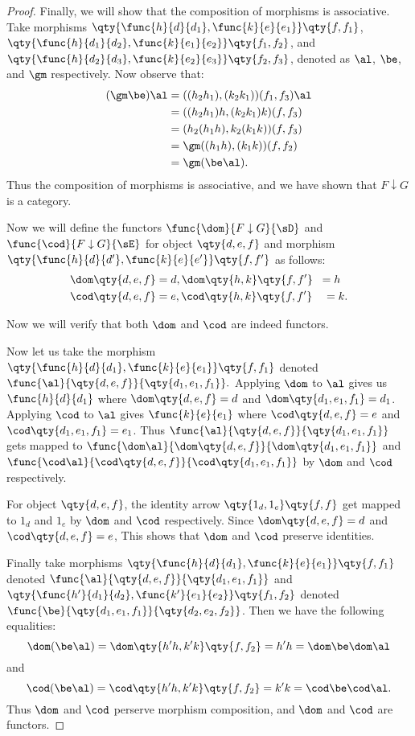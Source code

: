 \documentclass[../../main]{subfiles}
\begin{document}
\begin{proof}
	Finally, we will show that the composition of morphisms is associative. Take
	morphisms
	$\qty{\func{h}{d}{d_1},\func{k}{e}{e_1}} \qty{f,f_1}$,
	$\qty{\func{h}{d_1}{d_2},\func{k}{e_1}{e_2}} \qty{f_1,f_2}$, and
	$\qty{\func{h}{d_2}{d_3},\func{k}{e_2}{e_3}} \qty{f_2,f_3}$, denoted as
	$\al$, $\be$, and $\gm$ respectively. Now observe that:
	\begin{align*}
	(\gm\be)\al&=((h_2h_1),(k_2 k_1))(f_1,f_3) \al\\
	&=((h_2 h_1) h,(k_2 k_1) k)(f,f_3)\\
	&=(h_2(h_1 h),k_2(k_1 k))(f,f_3)\\
	&=\gm((h_1 h),(k_1 k))(f,f_2)\\
	&=\gm(\be \al).
	\end{align*}
	Thus the composition of morphisms is associative, and we have shown
	that $F \downarrow G$ is a category.

	Now we will define the functors $\func{\dom}{F \downarrow G}{\sD}$ and
	$\func{\cod}{F \downarrow G}{\sE}$ for object $\qty{d,e,f}$ and morphism
	$\qty{\func{h}{d}{d'},\func{k}{e}{e'}} \qty{f,f'}$ as follows:
	\begin{align*}
	\dom\qty{d,e,f} &= d, \dom\qty{h,k}\qty{f,f'} \;\;= h \\
	\cod\qty{d,e,f} &= e, \cod\qty{h,k}\qty{f,f'} \quad= k.
	\end{align*}

	Now we will verify that both $\dom$ and $\cod$ are indeed functors.

	Now let us take the morphism $\qty{\func{h}{d}{d_1},\func{k}{e}{e_1}}
	\qty{f,f_1}$  denoted $\func{\al}{\qty{d,e,f}}{\qty{d_1,e_1,f_1}}.$
	Applying $\dom$ to $\al$ gives us $\func{h}{d}{d_{1}}$ where $\dom\qty{d,e,f}
	= d$ and $\dom\qty{d_1,e_1,f_1} = d_1$. Applying $\cod$ to $\al$ gives
	$\func{k}{e}{e_{1}}$ where $\cod\qty{d,e,f} = e$ and $\cod\qty{d_1,e_1,f_1} =
	e_1$. Thus $\func{\al}{\qty{d,e,f}}{\qty{d_1,e_1,f_1}}$ gets mapped to
	$\func{\dom\al}{\dom\qty{d,e,f}}{\dom\qty{d_1,e_1,f_1}}$ and
	$\func{\cod\al}{\cod\qty{d,e,f}}{\cod\qty{d_1,e_1,f_1}}$ by $\dom$ and $\cod$
	respectively.

	For object $\qty{d,e,f}$, the identity arrow $\qty{1_{d},1_{e}}\qty{f,f}$
	get mapped to $1_d$ and $1_e$ by $\dom$ and $\cod$ respectively. Since
	$\dom\qty{d,e,f} = d$ and $\cod\qty{d,e,f} = e$, This shows that $\dom$ and
	$\cod$ preserve identities.

	Finally take morphisms $\qty{\func{h}{d}{d_1},\func{k}{e}{e_1}} \qty{f,f_1}$
	denoted $\func{\al}{\qty{d,e,f}}{\qty{d_1,e_1,f_1}}$ and
	$\qty{\func{h'}{d_1}{d_2},\func{k'}{e_1}{e_2}} \qty{f_1,f_2}$   denoted
	$\func{\be}{\qty{d_1,e_1,f_1}}{\qty{d_2,e_2,f_2}}$. Then we have the
	following equalities:
	\[\dom(\be \al) = \dom\qty{h'  h,k'  k}\qty{f,f_2} =h'
	 h = \dom\be  \dom\al\] and
	\[\cod(\be \al) = \cod \qty{h' h,k' k}\qty{f,f_2}=  k'
	 k = \cod\be\cod\al.\] Thus $\dom$ and $\cod$ perserve morphism
	composition, and $\dom$ and $\cod$ are functors.
\end{proof}
\end{document}
